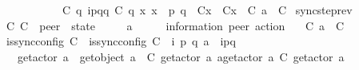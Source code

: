 \begin{isabellebody}
\ \ \ \ \ \ \ \ \ \ \ \ \ C{}\ q\ {\isasymmidarrow}{\isacharquery}{\kern0pt}{\isasymlangle}{\isacharparenleft}{\kern0pt}i\isactrlbsup p{\isasymrightarrow}q\isactrlesup {\isacharparenright}{\kern0pt}{\isasymrangle}{\isasymrightarrow}q\ {\isacharparenleft}{\kern0pt}C{}\ q{\isacharparenright}{\kern0pt}{\isacharsemicolon}{\kern0pt}\ {\isasymforall}x{\isachardot}{\kern0pt}\ x\ {\isasymnotin}\ {\isacharbraceleft}{\kern0pt}p{\isacharcomma}{\kern0pt}\ q{\isacharbraceright}{\kern0pt}\ {\isasymlongrightarrow}\ C{}{\isacharparenleft}{\kern0pt}x{\isacharparenright}{\kern0pt}\ {\isacharequal}{\kern0pt}\ C{}{\isacharparenleft}{\kern0pt}x{\isacharparenright}{\kern0pt}{\isasymrbrakk}\ {\isasymLongrightarrow}\ C{}\ {\isasymmidarrow}{\isasymlangle}a{\isacharcomma}{\kern0pt}\ {\isasymzero}{\isasymrangle}{\isasymrightarrow}\ C{}{\isachardoublequoteclose}\isanewline
\isanewline
{}\isamarkupfalse%
\ sync{\isacharunderscore}{\kern0pt}step{\isacharunderscore}{\kern0pt}rev{\isacharcolon}{\kern0pt}\isanewline
\ \ \ C{}\ C{}\ {\isacharcolon}{\kern0pt}{\isacharcolon}{\kern0pt}\ {\isachardoublequoteopen}{\isacharprime}{\kern0pt}peer\ {\isasymRightarrow}\ {\isacharprime}{\kern0pt}state{\isachardoublequoteclose}\isanewline
\ \ \ \ \ a\ \ \ \ \ {\isacharcolon}{\kern0pt}{\isacharcolon}{\kern0pt}\ {\isachardoublequoteopen}{\isacharparenleft}{\kern0pt}{\isacharprime}{\kern0pt}information{\isacharcomma}{\kern0pt}\ {\isacharprime}{\kern0pt}peer{\isacharparenright}{\kern0pt}\ action{\isachardoublequoteclose}\isanewline
\ \ \ {\isachardoublequoteopen}C{}\ {\isasymmidarrow}{\isasymlangle}a{\isacharcomma}{\kern0pt}\ {\isasymzero}{\isasymrangle}{\isasymrightarrow}\ C{}{\isachardoublequoteclose}\isanewline
\ \ \ {\isachardoublequoteopen}is{\isacharunderscore}{\kern0pt}sync{\isacharunderscore}{\kern0pt}config\ C{}{\isachardoublequoteclose}\ \ {\isachardoublequoteopen}is{\isacharunderscore}{\kern0pt}sync{\isacharunderscore}{\kern0pt}config\ C{}{\isachardoublequoteclose}\ \ {\isachardoublequoteopen}{\isasymexists}i\ p\ q{\isachardot}{\kern0pt}\ a\ {\isacharequal}{\kern0pt}\ {\isacharbang}{\kern0pt}{\isasymlangle}{\isacharparenleft}{\kern0pt}i\isactrlbsup p{\isasymrightarrow}q\isactrlesup {\isacharparenright}{\kern0pt}{\isasymrangle}{\isachardoublequoteclose}\isanewline
\ \ \ \ \ {\isachardoublequoteopen}get{\isacharunderscore}{\kern0pt}actor\ a\ {\isasymnoteq}\ get{\isacharunderscore}{\kern0pt}object\ a{\isachardoublequoteclose}\ \ {\isachardoublequoteopen}C{}\ {\isacharparenleft}{\kern0pt}get{\isacharunderscore}{\kern0pt}actor\ a{\isacharparenright}{\kern0pt}\ {\isasymmidarrow}a{\isasymrightarrow}{\isacharparenleft}{\kern0pt}get{\isacharunderscore}{\kern0pt}actor\ a{\isacharparenright}{\kern0pt}\ {\isacharparenleft}{\kern0pt}C{}\ {\isacharparenleft}{\kern0pt}get{\isacharunderscore}{\kern0pt}actor\ a{\isacharparenright}{\kern0pt}{\isacharparenright}{\kern0pt}{\isachardoublequoteclose}\isanewline

\end{isabellebody}
